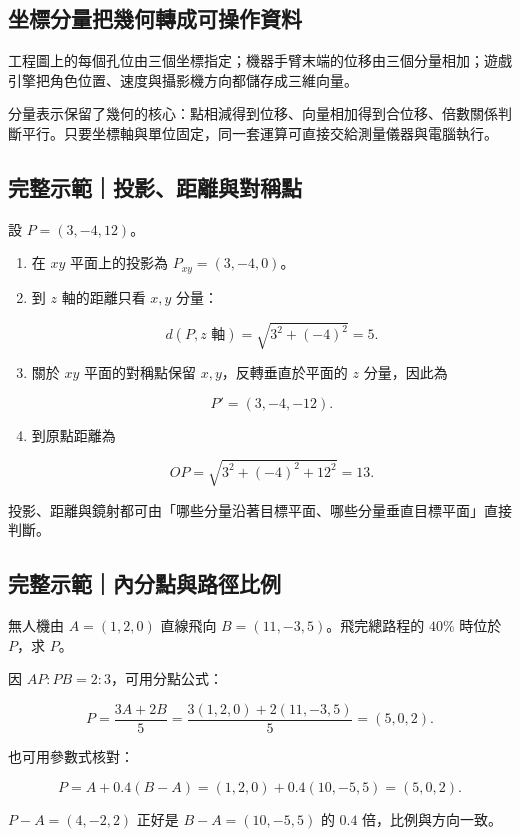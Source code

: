 \documentclass[11pt,a4paper]{article}
\begin{document}
\subsection{坐標分量把幾何轉成可操作資料}\label{ux5750ux6a19ux5206ux91cfux628aux5e7eux4f55ux8f49ux6210ux53efux64cdux4f5cux8cc7ux6599}

工程圖上的每個孔位由三個坐標指定；機器手臂末端的位移由三個分量相加；遊戲引擎把角色位置、速度與攝影機方向都儲存成三維向量。

分量表示保留了幾何的核心：點相減得到位移、向量相加得到合位移、倍數關係判斷平行。只要坐標軸與單位固定，同一套運算可直接交給測量儀器與電腦執行。

\begin{HandoutWorkedExample}

\subsection{完整示範｜投影、距離與對稱點}\label{ux5b8cux6574ux793aux7bc4ux6295ux5f71ux8dddux96e2ux8207ux5c0dux7a31ux9ede}

設 \(P=(3,-4,12)\)。

\begin{enumerate}
\def\labelenumi{\arabic{enumi}.}
\item
  在 \(xy\) 平面上的投影為 \(P_{xy}=(3,-4,0)\)。
\item
  到 \(z\) 軸的距離只看 \(x,y\) 分量：

  \[
  d(P,z\text{ 軸})=\sqrt{3^2+(-4)^2}=5.
  \]
\item
  關於 \(xy\) 平面的對稱點保留 \(x,y\)，反轉垂直於平面的 \(z\) 分量，因此為

  \[
  P'=(3,-4,-12).
  \]
\item
  到原點距離為

  \[
  OP=\sqrt{3^2+(-4)^2+12^2}=13.
  \]
\end{enumerate}

投影、距離與鏡射都可由「哪些分量沿著目標平面、哪些分量垂直目標平面」直接判斷。

\end{HandoutWorkedExample}

\begin{HandoutWorkedExample}

\subsection{完整示範｜內分點與路徑比例}\label{ux5b8cux6574ux793aux7bc4ux5167ux5206ux9edeux8207ux8defux5f91ux6bd4ux4f8b}

無人機由 \(A=(1,2,0)\) 直線飛向 \(B=(11,-3,5)\)。飛完總路程的 \(40\%\) 時位於 \(P\)，求 \(P\)。

因 \(AP:PB=2:3\)，可用分點公式：

\[
P=\frac{3A+2B}{5}
=\frac{3(1,2,0)+2(11,-3,5)}5
=(5,0,2).
\]

也可用參數式核對：

\[
P=A+0.4(B-A)
=(1,2,0)+0.4(10,-5,5)
=(5,0,2).
\]

\(P-A=(4,-2,2)\) 正好是 \(B-A=(10,-5,5)\) 的 \(0.4\) 倍，比例與方向一致。

\end{HandoutWorkedExample}
\end{document}
